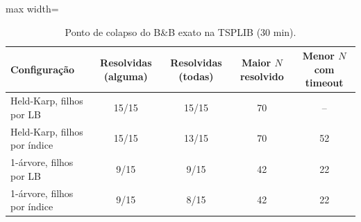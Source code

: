 \begin{table}[htb]
\centering
\caption{Ponto de colapso do B\&B exato na TSPLIB (30 min).}
\label{tab:colapso}
\small
\begin{adjustbox}{max width=\linewidth}
\begin{tabular}{lcccc}
\toprule
Configuração & Resolvidas (alguma) & Resolvidas (todas) & Maior $N$ resolvido & Menor $N$ com timeout \\
\midrule
Held-Karp, filhos por LB & 15/15 & 15/15 & 70 & -- \\
Held-Karp, filhos por índice & 15/15 & 13/15 & 70 & 52 \\
1-árvore, filhos por LB & 9/15 & 9/15 & 42 & 22 \\
1-árvore, filhos por índice & 9/15 & 8/15 & 42 & 22 \\
\bottomrule
\end{tabular}
\end{adjustbox}
\end{table}
